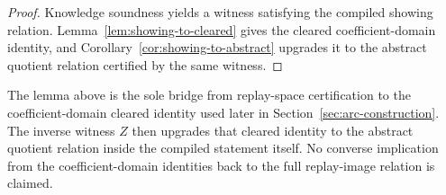 \begin{proof}
Knowledge soundness yields a witness satisfying the compiled showing relation. Lemma~\ref{lem:showing-to-cleared} gives
the cleared coefficient-domain identity, and Corollary~\ref{cor:showing-to-abstract} upgrades it to the abstract
quotient relation certified by the same witness.
\end{proof}

\begin{remark}
The lemma above is the sole bridge from replay-space certification to the coefficient-domain cleared identity used later
in Section~\ref{sec:arc-construction}. The inverse witness \(Z\) then upgrades that cleared identity to the abstract
quotient relation inside the compiled statement itself. No converse implication from the coefficient-domain identities back
to the full replay-image relation is claimed.
\end{remark}
